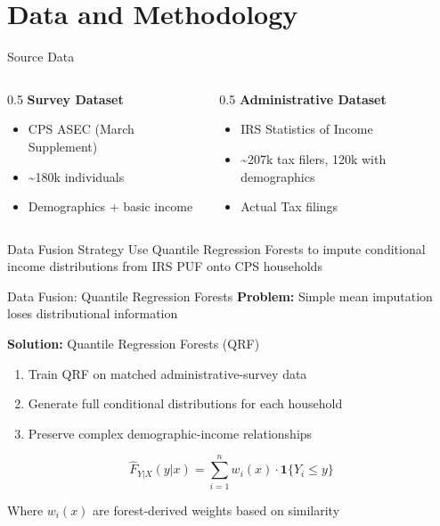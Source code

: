 \documentclass[11pt,aspectratio=169]{beamer}
\begin{document}
\section{Data and Methodology}
\begin{frame}{Source Data}
\begin{columns}
\begin{column}{0.5\textwidth}
    \textbf{Survey Dataset}
    \begin{itemize}
        \item CPS ASEC (March Supplement)
        \item \textasciitilde180k individuals
        \item Demographics + basic income
    \end{itemize}
\end{column}
\begin{column}{0.5\textwidth}
    \textbf{Administrative Dataset}
    \begin{itemize}
        \item IRS Statistics of Income
        \item \textasciitilde207k tax filers, 120k with demographics
        \item Actual Tax filings 
    \end{itemize}
\end{column}
\end{columns}

\vspace{0.5cm}
\begin{block}{Data Fusion Strategy}
Use Quantile Regression Forests to impute conditional income distributions from IRS PUF onto CPS households
\end{block}
\end{frame}

\begin{frame}{Data Fusion: Quantile Regression Forests}
\textbf{Problem:} Simple mean imputation loses distributional information

\vspace{0.3cm}
\textbf{Solution:} Quantile Regression Forests (QRF)
\begin{enumerate}
    \item Train QRF on matched administrative-survey data
    \item Generate full conditional distributions for each household
    \item Preserve complex demographic-income relationships
\end{enumerate}

\vspace{0.3cm}
\begin{equation*}
\hat{F}_{Y|X}(y|x) = \sum_{i=1}^{n} w_i(x) \cdot \mathbf{1}\{Y_i \leq y\}
\end{equation*}

Where $w_i(x)$ are forest-derived weights based on similarity
\end{frame}
\end{document}
